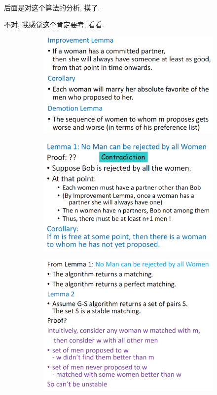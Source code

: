 后面是对这个算法的分析, 摸了.

不对, 我感觉这个肯定要考, 看看.

\begin{figure}[!htb]
    \centering
    \begin{subfigure}{0.309\textwidth}
        \centering
        \includegraphics[width=\textwidth]{pic/DAA10/Facts}
    \end{subfigure}
    \begin{subfigure}{0.309\textwidth}
        \centering
        \includegraphics[width=\textwidth]{pic/DAA10/Facts1}
    \end{subfigure}
    \begin{subfigure}{0.309\textwidth}
        \centering
        \includegraphics[width=\textwidth]{pic/DAA10/Facts2}

\end{subfigure}
\end{figure}
